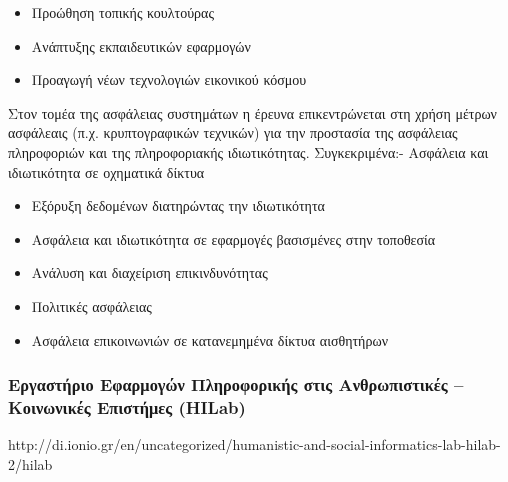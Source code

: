 \begin{itemize}
\item
  Προώθηση τοπικής κουλτούρας
\item
  Ανάπτυξης εκπαιδευτικών εφαρμογών
\item
  Προαγωγή νέων τεχνολογιών εικονικού κόσμου
\end{itemize}

Στον τομέα της ασφάλειας συστημάτων η έρευνα επικεντρώνεται στη χρήση
μέτρων ασφάλεαις (π.χ. κρυπτογραφικών τεχνικών) για την προστασία της
ασφάλειας πληροφοριών και της πληροφοριακής ιδιωτικότητας.
Συγκεκριμένα:- Ασφάλεια και ιδιωτικότητα σε οχηματικά δίκτυα

\begin{itemize}
\item
  Εξόρυξη δεδομένων διατηρώντας την ιδιωτικότητα
\item
  Ασφάλεια και ιδιωτικότητα σε εφαρμογές βασισμένες στην τοποθεσία
\item
  Ανάλυση και διαχείριση επικινδυνότητας
\item
  Πολιτικές ασφάλειας
\item
  Ασφάλεια επικοινωνιών σε κατανεμημένα δίκτυα αισθητήρων
\end{itemize}

\hypertarget{ux3b5ux3c1ux3b3ux3b1ux3c3ux3c4ux3aeux3c1ux3b9ux3bf-ux3b5ux3c6ux3b1ux3c1ux3bcux3bfux3b3ux3ceux3bd-ux3c0ux3bbux3b7ux3c1ux3bfux3c6ux3bfux3c1ux3b9ux3baux3aeux3c2-ux3c3ux3c4ux3b9ux3c2-ux3b1ux3bdux3b8ux3c1ux3c9ux3c0ux3b9ux3c3ux3c4ux3b9ux3baux3adux3c2-ux3baux3bfux3b9ux3bdux3c9ux3bdux3b9ux3baux3adux3c2-ux3b5ux3c0ux3b9ux3c3ux3c4ux3aeux3bcux3b5ux3c2-hilab}{%
\subsubsection{Εργαστήριο Εφαρμογών Πληροφορικής στις Ανθρωπιστικές --
Κοινωνικές Επιστήμες
(HILab)}\label{ux3b5ux3c1ux3b3ux3b1ux3c3ux3c4ux3aeux3c1ux3b9ux3bf-ux3b5ux3c6ux3b1ux3c1ux3bcux3bfux3b3ux3ceux3bd-ux3c0ux3bbux3b7ux3c1ux3bfux3c6ux3bfux3c1ux3b9ux3baux3aeux3c2-ux3c3ux3c4ux3b9ux3c2-ux3b1ux3bdux3b8ux3c1ux3c9ux3c0ux3b9ux3c3ux3c4ux3b9ux3baux3adux3c2-ux3baux3bfux3b9ux3bdux3c9ux3bdux3b9ux3baux3adux3c2-ux3b5ux3c0ux3b9ux3c3ux3c4ux3aeux3bcux3b5ux3c2-hilab}}

http://di.ionio.gr/en/uncategorized/humanistic-and-social-informatics-lab-hilab-2/hilab

